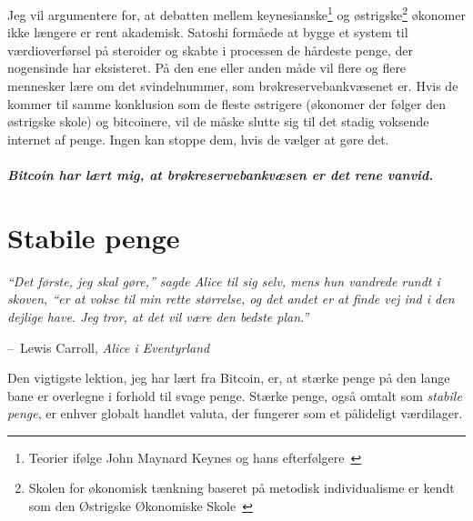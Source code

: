 \documentclass[paper=6in:9in,pagesize=pdftex,
               headinclude=on,footinclude=on,12pt]{scrbook}
\makeatletter
\newenvironment{chapquote}[2][4em]{\setlength{\@tempdima}{#1}%
   \def\chapquote@author{#2}%
   \parshape 1 \@tempdima \dimexpr\textwidth-2\@tempdima\relax%
   \itshape}{\par\normalfont\hfill--\ \chapquote@author\hspace*{\@tempdima}\par\bigskip}
\makeatother
\begin{document}
Jeg vil argumentere for, at debatten mellem keynesianske\footnote{Teorier ifølge John Maynard Keynes og hans efterfølgere~\cite{wiki:keynesian}} og østrigske\footnote{Skolen for økonomisk tænkning baseret på metodisk individualisme er kendt som den Østrigske Økonomiske Skole~\cite{wiki:austrian}} økonomer ikke længere er rent akademisk. Satoshi formåede at bygge et system til værdioverførsel på steroider og skabte i processen de hårdeste penge, der nogensinde har eksisteret. På den ene eller anden måde vil flere og flere mennesker lære om det svindelnummer, som brøkreservebankvæsenet er. Hvis de kommer til samme konklusion som de fleste østrigere (økonomer der følger den østrigske skole) og bitcoinere, vil de måske slutte sig til det stadig voksende internet af penge. Ingen kan stoppe dem, hvis de vælger at gøre det.\paragraph{Bitcoin har lært mig, at brøkreservebankvæsen er det rene vanvid.}%
%
%
%
%
%

\chapter{Stabile penge}
\label{les:14}

\begin{chapquote}{Lewis Carroll, \textit{Alice i Eventyrland}} \enquote{Det første, jeg skal gøre,} sagde Alice til sig selv, mens hun vandrede rundt i skoven, \enquote{er at vokse til min rette størrelse, og det andet er at finde vej ind i den dejlige have. Jeg tror, at det vil være den bedste plan.} \end{chapquote}

Den vigtigste lektion, jeg har lært fra Bitcoin, er, at stærke penge på den lange bane er overlegne i forhold til svage penge. Stærke penge, også omtalt som \textit{stabile penge}, er enhver globalt handlet valuta, der fungerer som et pålideligt værdilager.
\end{document}
